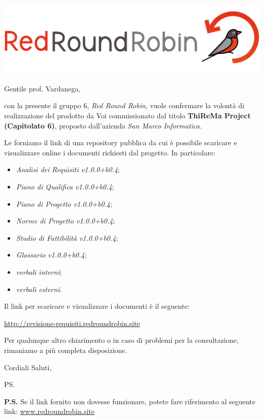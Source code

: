 \documentclass[12pt]{letter}
\date{14 Gennaio 2020}
\begin{document}
\begin{letter}{ }

\includegraphics[scale=0.17]{images/logo.png}

\opening{Gentile prof. Vardanega, }

con la presente il gruppo 6, \textit{Red Round Robin}, vuole confermare la volontà di realizzazione del prodotto da Voi commissionato dal titolo 
\textbf{ThiReMa Project (Capitolato 6)}, proposto dall'azienda \textit{San Marco Informatica}. 

Le forniamo il link di una repository pubblica da cui è possibile scaricare e visualizzare online i documenti richiesti dal progetto.
In particolare:

\begin{itemize}
	\item \textit{Analisi dei Requisiti v1.0.0+b0.4};
	\item \textit{Piano di Qualifica v1.0.0+b0.4};
	\item \textit{Piano di Progetto v1.0.0+b0.4};
	\item \textit{Norme di Progetto v1.0.0+b0.4};
	\item \textit{Studio di Fattibilità v1.0.0+b0.4};
	\item \textit{Glossario v1.0.0+b0.4};
	\item \textit{verbali interni};
	\item \textit{verbali esterni}.
\end{itemize}

Il link per scaricare e visualizzare i documenti è il seguente:

\begin{center}
\href{http://revisione-requisiti.redroundrobin.site}{http://revisione-requisiti.redroundrobin.site}
\end{center}

\newpage

Per qualunque altro chiarimento o in caso di problemi per la consultazione, rimaniamo a più completa disposizione.

\closing{Cordiali Saluti,}


\vspace{3em}
\ps 

\textbf{P.S.} Se il link fornito non dovesse funzionare, potete fare riferimento al seguente link: 
\href{https://www.redroundrobin.site}{www.redroundrobin.site}

\end{letter}
\end{document}
